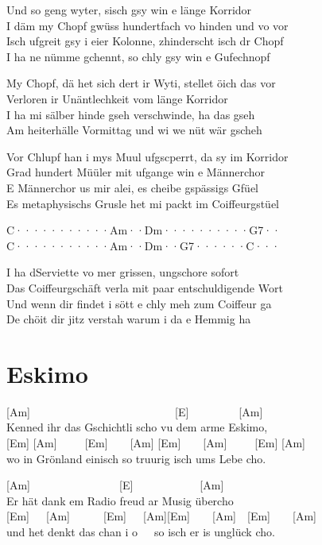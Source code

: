 \documentclass[
  letterpaper,
  a5paper]{memoir}
\begin{document}
Und so geng wyter, s\textquotesingle isch gsy win e länge Korridor\\
I däm my Chopf gwüss hundertfach vo hinden und vo vor\\
Isch ufgreit gsy i eier Kolonne, z\textquotesingle hinderscht isch dr
Chopf\\
I ha ne nümme gchennt, so chly gsy win e Gufechnopf

My Chopf, dä het sich dert ir Wyti, stellet öich das vor\\
Verloren ir Unäntlechkeit vom länge Korridor\\
I ha mi sälber hinde gseh verschwinde, ha das gseh\\
Am heiterhälle Vormittag und wi we nüt wär gscheh

Vor Chlupf han i mys Muul ufgscperrt, da sy im Korridor\\
Grad hundert Müüler mit ufgange win e Männerchor\\
E Männerchor us mir alei, es cheibe gspässigs Gfüel\\
Es metaphysischs Grusle het mi packt im Coiffeurgstüel

\textbar C·······\textbar····Am··\textbar Dm······\textbar····G7··\textbar{}\\
\textbar C·······\textbar····Am··\textbar Dm··G7··\textbar····C···\textbar{}

I ha d\textquotesingle Serviette vo mer grissen, ungschore sofort\\
Das Coiffeurgschäft verla mit paar entschuldigende Wort\\
Und wenn dir findet i sött e chly meh zum Coiffeur ga\\
De chöit dir jitz verstah warum i da e Hemmig ha

\hypertarget{eskimo}{%
\chapter{Eskimo}\label{eskimo}}

{[}Am{]}~~~~~~~~~~~~~~~~~~~~~~~~~~{[}E{]}~~~~~~~~~{[}Am{]}\\
Kenned ihr das Gschichtli scho vu dem arme Eskimo,\\
{[}Em{]} {[}Am{]}~~~~~{[}Em{]}~~~~{[}Am{]}
{[}Em{]}~~~~{[}Am{]}~~~~~{[}Em{]} {[}Am{]}\\
wo in Grönland einisch so truurig isch ums Lebe cho.

{[}Am{]}~~~~~~~~~~~~~~~~{[}E{]}~~~~~~~~~~~~{[}Am{]}\\
Er hät dank em Radio freud ar Musig übercho\\
{[}Em{]}~~~{[}Am{]}~~~~~~{[}Em{]}~~~{[}Am{]}{[}Em{]}~~~~{[}Am{]}~~{[}Em{]}~~~~{[}Am{]}\\
und het denkt das chan i o~~~so isch er is unglück cho.
\end{document}
